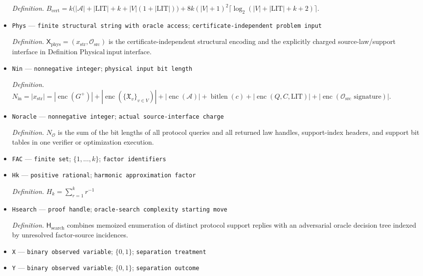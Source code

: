 \documentclass{article}
\begin{document}
\begin{itemize}
  \par\smallskip\noindent\emph{Definition.} \(B_{\mathrm{cert}}=k\bigl(|\mathcal A|+|\mathrm{LIT}|+k+|V|(1+|\mathrm{LIT}|)\bigr)+8k(|V|+1)^2\lceil\log_2(|V|+|\mathrm{LIT}|+k+2)\rceil\).
  \item \texttt{Phys} --- \texttt{finite structural string with oracle access}; \texttt{certificate-\allowbreak{}independent problem input}
  \par\smallskip\noindent\emph{Definition.} \(\mathsf X_{\mathrm{phys}}=(x_{\mathrm{str}},\mathcal O_{\mathrm{src}})\) is the certificate-independent structural encoding and the explicitly charged source-law/support interface in Definition \(\mathrm{Physical\ input\ interface}\).
  \item \texttt{Nin} --- \texttt{nonnegative integer}; \texttt{physical input bit length}
  \par\smallskip\noindent\emph{Definition.} \(N_{\mathrm{in}}=|x_{\mathrm{str}}|=|\operatorname{enc}(G^{+})|+|\operatorname{enc}(\{\mathfrak X_v\}_{v\in V})|+|\operatorname{enc}(\mathcal A)|+\operatorname{bitlen}(c)+|\operatorname{enc}(Q,C,\mathrm{LIT})|+|\operatorname{enc}(\mathcal O_{\mathrm{src}}\text{ signature})|\).
  \item \texttt{Noracle} --- \texttt{nonnegative integer}; \texttt{actual source-\allowbreak{}interface charge}
  \par\smallskip\noindent\emph{Definition.} \(N_{\mathcal O}\) is the sum of the bit lengths of all protocol queries and all returned law handles, support-index headers, and support bit tables in one verifier or optimization execution.
  \item \texttt{FAC} --- \texttt{finite set}; \(\{1,\ldots,k\}\); \texttt{factor identifiers}
  \item \texttt{Hk} --- \texttt{positive rational}; \texttt{harmonic approximation factor}
  \par\smallskip\noindent\emph{Definition.} \(H_k=\sum_{r=1}^{k}r^{-1}\)
  \item \texttt{Hsearch} --- \texttt{proof handle}; \texttt{oracle-\allowbreak{}search complexity starting move}
  \par\smallskip\noindent\emph{Definition.} \(\mathsf H_{\mathrm{search}}\) combines memoized enumeration of distinct protocol support replies with an adversarial oracle decision tree indexed by unresolved factor-source incidences.
  \item \texttt{X} --- \texttt{binary observed variable}; \(\{0,1\}\); \texttt{separation treatment}
  \item \texttt{Y} --- \texttt{binary observed variable}; \(\{0,1\}\); \texttt{separation outcome}

\end{itemize}
\end{document}
